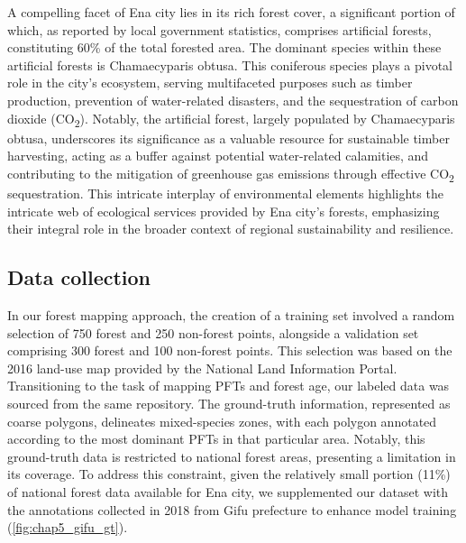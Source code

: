 A compelling facet of Ena city lies in its rich forest cover, a significant portion of which, as reported by local government statistics, comprises artificial forests, constituting 60\% of the total forested area. The dominant species within these artificial forests is Chamaecyparis obtusa. This coniferous species plays a pivotal role in the city's ecosystem, serving multifaceted purposes such as timber production, prevention of water-related disasters, and the sequestration of carbon dioxide (CO\textsubscript{2}). Notably, the artificial forest, largely populated by Chamaecyparis obtusa, underscores its significance as a valuable resource for sustainable timber harvesting, acting as a buffer against potential water-related calamities, and contributing to the mitigation of greenhouse gas emissions through effective CO\textsubscript{2} sequestration. This intricate interplay of environmental elements highlights the intricate web of ecological services provided by Ena city's forests, emphasizing their integral role in the broader context of regional sustainability and resilience. \par

\subsection{Data collection}
In our forest mapping approach, the creation of a training set involved a random selection of 750 forest and 250 non-forest points, alongside a validation set comprising 300 forest and 100 non-forest points. This selection was based on the 2016 land-use map provided by the National Land Information Portal. Transitioning to the task of mapping PFTs and forest age, our labeled data was sourced from the same repository. The ground-truth information, represented as coarse polygons, delineates mixed-species zones, with each polygon annotated according to the most dominant PFTs in that particular area. Notably, this ground-truth data is restricted to national forest areas, presenting a limitation in its coverage. To address this constraint, given the relatively small portion (11\%) of national forest data available for Ena city, we supplemented our dataset with the annotations collected in 2018 from Gifu prefecture to enhance model training (\ref{fig:chap5_gifu_gt}). \par


